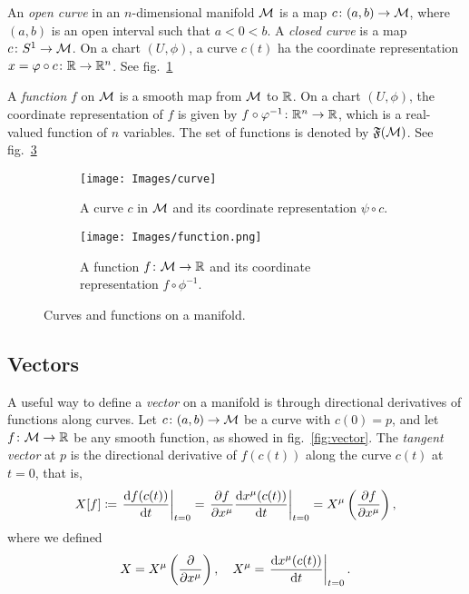\begin{definition}[Curve]
	An \emph{open curve} in an $n$-dimensional manifold $\mathcal{M}$ is a map $c \colon (a,b) \to \mathcal{M}$, where $(a,b)$ is an open interval such that $a<0<b$. A \emph{closed curve} is a map $c \colon S^1 \to \mathcal{M}$. On a chart $(U,\phi)$, a curve $c(t)$ ha the coordinate representation $x=\varphi \circ c \colon \mathbb{R} \to \mathbb{R}^n$. See fig.~\ref{fig:curve}
\end{definition}

\begin{definition}[Function]
	A \emph{function} $f$ on $\mathcal{M}$ is a smooth map from $\mathcal{M}$ to $\mathbb{R}$. On a chart $(U,\phi)$, the coordinate representation of $f$ is given by $f \circ \varphi^{-1} \colon \mathbb{R}^n \to \mathbb{R}$, which is a real-valued function of $n$ variables. The set of functions is denoted by $\mathfrak{F}(\mathcal{M})$. See fig.~\ref{fig:function}
\end{definition}

\begin{figure}
	\centering
	\begin{subfigure}[b]{0.38\textwidth}
		\texttt{[image: Images/curve]}
		\caption{A curve $c$ in $\mathcal{M}$ and its coordinate representation $\psi \circ c$.}
		\label{fig:curve}
	\end{subfigure}
	\hfill
	\begin{subfigure}[b]{0.42\textwidth}
		\texttt{[image: Images/function.png]}
		\caption{A function $f\colon \mathcal{M} \to \mathbb{R}$ and its coordinate representation $f \circ \phi^{-1}$.}
		\label{fig:function}
	\end{subfigure}
	\caption{Curves and functions on a manifold.}
\end{figure}

\subsection{Vectors}
A useful way to define a \emph{vector} on a manifold is through directional derivatives of functions along curves. Let $c\colon (a,b) \to \mathcal{M}$ be a curve with $c(0)=p$, and let $f \colon \mathcal{M} \to \mathbb{R}$ be any smooth function, as showed in fig.~\ref{fig:vector}. The \emph{tangent vector} at $p$ is the directional derivative of $f(c(t))$ along the curve $c(t)$ at $t=0$, that is,
\begin{equation}
	X[f] \coloneq \left. \frac{\mathop{}\!\mathrm{d} f (c(t))}{\mathop{}\!\mathrm{d} t}\right|_{t=0} = \left. \frac{\partial f}{\partial x^\mu} \frac{\mathop{}\!\mathrm{d} x^\mu(c(t))}{\mathop{}\!\mathrm{d} t} \right|_{t=0} = X^\mu \left(\frac{\partial f}{\partial x^\mu}\right),
\end{equation}
where we defined
\begin{equation}\label{eq:def-vectors}
	X = X^\mu \left(\frac{\partial}{\partial x^\mu}\right), \quad X^\mu = \left. \frac{\mathop{}\!\mathrm{d} x^\mu(c(t))}{\mathop{}\!\mathrm{d} t} \right|_{t=0} .
\end{equation}

